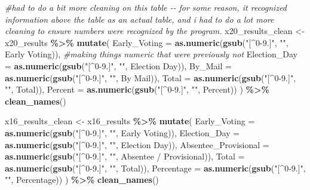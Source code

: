 \documentclass[
]{article}
\newenvironment{Shaded}{\begin{snugshade}}{\end{snugshade}}
\newcommand{\AttributeTok}[1]{\textcolor[rgb]{0.13,0.29,0.53}{#1}}
\newcommand{\CommentTok}[1]{\textcolor[rgb]{0.56,0.35,0.01}{\textit{#1}}}
\newcommand{\FunctionTok}[1]{\textcolor[rgb]{0.13,0.29,0.53}{\textbf{#1}}}
\newcommand{\NormalTok}[1]{#1}
\newcommand{\OtherTok}[1]{\textcolor[rgb]{0.56,0.35,0.01}{#1}}
\newcommand{\SpecialCharTok}[1]{\textcolor[rgb]{0.81,0.36,0.00}{\textbf{#1}}}
\newcommand{\StringTok}[1]{\textcolor[rgb]{0.31,0.60,0.02}{#1}}
\begin{document}
\begin{Shaded}
\begin{Highlighting}[]
\CommentTok{\#had to do a bit more cleaning on this table {-}{-} for some reason, it recognized information above the table as an actual table, and i had to do a lot more cleaning to ensure numbers were recognized by the program. }
\NormalTok{x20\_results\_clean }\OtherTok{\textless{}{-}}\NormalTok{ x20\_results }\SpecialCharTok{\%\textgreater{}\%}
  \FunctionTok{mutate}\NormalTok{(}
    \AttributeTok{Early\_Voting =} \FunctionTok{as.numeric}\NormalTok{(}\FunctionTok{gsub}\NormalTok{(}\StringTok{"[\^{}0{-}9.]"}\NormalTok{, }\StringTok{""}\NormalTok{, }\StringTok{\textasciigrave{}}\AttributeTok{Early Voting}\StringTok{\textasciigrave{}}\NormalTok{)),  }\CommentTok{\#making things numeric that were previously not}
    \AttributeTok{Election\_Day =} \FunctionTok{as.numeric}\NormalTok{(}\FunctionTok{gsub}\NormalTok{(}\StringTok{"[\^{}0{-}9.]"}\NormalTok{, }\StringTok{""}\NormalTok{, }\StringTok{\textasciigrave{}}\AttributeTok{Election Day}\StringTok{\textasciigrave{}}\NormalTok{)),}
    \AttributeTok{By\_Mail =} \FunctionTok{as.numeric}\NormalTok{(}\FunctionTok{gsub}\NormalTok{(}\StringTok{"[\^{}0{-}9.]"}\NormalTok{, }\StringTok{""}\NormalTok{, }\StringTok{\textasciigrave{}}\AttributeTok{By Mail}\StringTok{\textasciigrave{}}\NormalTok{)),}
    \AttributeTok{Total =} \FunctionTok{as.numeric}\NormalTok{(}\FunctionTok{gsub}\NormalTok{(}\StringTok{"[\^{}0{-}9.]"}\NormalTok{, }\StringTok{""}\NormalTok{, Total)),}
    \AttributeTok{Percent =} \FunctionTok{as.numeric}\NormalTok{(}\FunctionTok{gsub}\NormalTok{(}\StringTok{"[\^{}0{-}9.]"}\NormalTok{, }\StringTok{""}\NormalTok{, Percent))}
\NormalTok{  ) }\SpecialCharTok{\%\textgreater{}\%}
  \FunctionTok{clean\_names}\NormalTok{()}

\NormalTok{x16\_results\_clean }\OtherTok{\textless{}{-}}\NormalTok{ x16\_results }\SpecialCharTok{\%\textgreater{}\%}
  \FunctionTok{mutate}\NormalTok{(}
    \AttributeTok{Early\_Voting =} \FunctionTok{as.numeric}\NormalTok{(}\FunctionTok{gsub}\NormalTok{(}\StringTok{"[\^{}0{-}9.]"}\NormalTok{, }\StringTok{""}\NormalTok{, }\StringTok{\textasciigrave{}}\AttributeTok{Early Voting}\StringTok{\textasciigrave{}}\NormalTok{)), }
    \AttributeTok{Election\_Day =} \FunctionTok{as.numeric}\NormalTok{(}\FunctionTok{gsub}\NormalTok{(}\StringTok{"[\^{}0{-}9.]"}\NormalTok{, }\StringTok{""}\NormalTok{, }\StringTok{\textasciigrave{}}\AttributeTok{Election Day}\StringTok{\textasciigrave{}}\NormalTok{)),}
    \AttributeTok{Absentee\_Provisional =} \FunctionTok{as.numeric}\NormalTok{(}\FunctionTok{gsub}\NormalTok{(}\StringTok{"[\^{}0{-}9.]"}\NormalTok{, }\StringTok{""}\NormalTok{, }\StringTok{\textasciigrave{}}\AttributeTok{Absentee / Provisional}\StringTok{\textasciigrave{}}\NormalTok{)),}
    \AttributeTok{Total =} \FunctionTok{as.numeric}\NormalTok{(}\FunctionTok{gsub}\NormalTok{(}\StringTok{"[\^{}0{-}9.]"}\NormalTok{, }\StringTok{""}\NormalTok{, Total)),}
    \AttributeTok{Percentage =} \FunctionTok{as.numeric}\NormalTok{(}\FunctionTok{gsub}\NormalTok{(}\StringTok{"[\^{}0{-}9.]"}\NormalTok{, }\StringTok{""}\NormalTok{, Percentage))}
\NormalTok{  ) }\SpecialCharTok{\%\textgreater{}\%}
  \FunctionTok{clean\_names}\NormalTok{()}


\end{Highlighting}
\end{Shaded}
\end{document}
